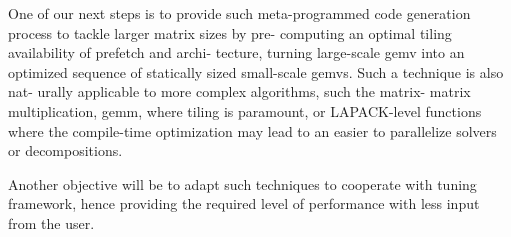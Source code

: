 \documentclass[../main]{subfiles}
\begin{document}
One of our next steps is to provide such meta-programmed
code generation process to tackle larger matrix sizes by pre-
computing an optimal tiling availability of prefetch and archi-
tecture, turning large-scale gemv into an optimized sequence of
statically sized small-scale gemvs. Such a technique is also nat-
urally applicable to more complex algorithms, such the matrix-
matrix multiplication, gemm, where tiling is paramount, or
LAPACK-level functions where the compile-time optimization
may lead to an easier to parallelize solvers or decompositions.

Another objective will be to adapt such techniques to cooperate
with tuning framework, hence providing the required level of
performance with less input from the user.
\end{document}
